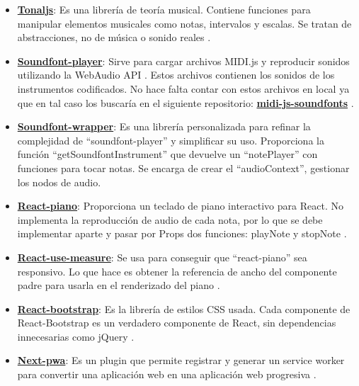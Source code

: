\documentclass[12pt,twoside,titlepage]{report}
\begin{document}
\begin{itemize}
    \item \href{https://github.com/tonaljs/tonal}{\textbf{Tonaljs}}: Es una librería de teoría musical. Contiene funciones para manipular elementos musicales como notas, intervalos y escalas. Se tratan de abstracciones, no de música o sonido reales \cite{tonal}.
    \item \href{https://github.com/danigb/soundfont-player}{\textbf{Soundfont-player}}: Sirve para cargar archivos MIDI.js y reproducir sonidos utilizando la WebAudio API \cite{webAudioAPI}. Estos archivos contienen los sonidos de los instrumentos codificados. No hace falta contar con estos archivos en local ya que en tal caso los buscaría en el siguiente repositorio: \href{https://github.com/gleitz/midi-js-soundfonts}{{\textbf{midi-js-soundfonts}}} \cite{soundfont-player}.
    \item \href{https://github.com/alberttogoca/EarFit/blob/main/src/lib/soundfont-wrapper.ts}{\textbf{Soundfont-wrapper}}: Es una librería personalizada para refinar la complejidad de ``soundfont-player'' y simplificar su uso. Proporciona la función ``getSoundfontInstrument'' que devuelve un ``notePlayer'' con funciones para tocar notas. Se encarga de crear el ``audioContext'', gestionar los nodos de audio.
    \item \href{https://github.com/kevinsqi/react-piano}{\textbf{React-piano}}: Proporciona un teclado de piano interactivo para React. No implementa la reproducción de audio de cada nota, por lo que se debe implementar aparte y pasar por Props dos funciones: playNote y stopNote \cite{react-piano}.
    \item \href{https://github.com/pmndrs/react-use-measure}{\textbf{React-use-measure}}: Se usa para conseguir que ``react-piano'' sea responsivo. Lo que hace es obtener la referencia de ancho del componente padre para usarla en el renderizado del piano \cite{react-use-measure}.
    \item \href{https://github.com/react-bootstrap/react-bootstrap}{\textbf{React-bootstrap}}: Es la librería de estilos CSS usada. Cada componente de React-Bootstrap es un verdadero componente de React, sin dependencias innecesarias como jQuery \cite{react-bootstrap}.
    \item \href{https://github.com/shadowwalker/next-pwa}{\textbf{Next-pwa}}: Es un plugin que permite registrar y generar un service worker para convertir una aplicación web en una aplicación web progresiva \cite{next-pwa}.
\end{itemize}
\end{document}
